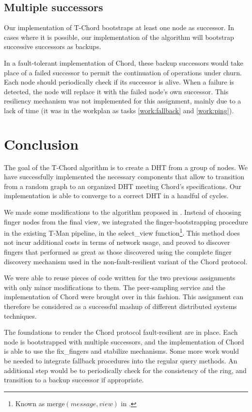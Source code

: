 \documentclass[11pt,a4paper,parskip=half]{scrartcl}
\begin{document}
\subsection{Multiple successors}

Our implementation of T-Chord bootstraps at least one node as successor.
In cases where it is possible, our implementation of the algorithm will bootstrap successive successors as backups.

In a fault-tolerant implementation of Chord, these backup successors would take place of a failed successor to permit the continuation of operations under churn.
Each node should periodically check if its successor is alive.
When a failure is detected, the node will replace it with the failed node's own successor.
This resiliency mechanism was not implemented for this assignment, mainly due to a lack of time (it was in the workplan as tasks \ref{work:fallback} and \ref{work:ping}).

\section{Conclusion}

The goal of the T-Chord algorithm is to create a DHT from a group of nodes.
We have successfully implemented the necessary components that allow to transition from a random graph to an organized DHT meeting Chord's specifications.
Our implementation is able to converge to a correct DHT in a handful of cycles.

We made some modifications to the algorithm proposed in \autocite{cod}.
Instead of choosing finger nodes from the final view, we integrated the finger-bootstrapping procedure in the existing T-Man pipeline, in the \textsf{select\_view} function\footnote{Known as $\text{merge}\left(message, view\right)$ in \autocite{cod}.}.
This method does not incur additional costs in terms of network usage, and proved to discover fingers that performed as great as those discovered using the complete finger discovery mechanism used in the non-fault-resilient variant of the Chord protocol.

We were able to reuse pieces of code written for the two previous assignments with only minor modifications to them.
The peer-sampling service and the implementation of Chord were brought over in this fashion.
This assignment can therefore be considered as a successful mashup of different distributed systems techniques.

The foundations to render the Chord protocol fault-resilient are in place.
Each node is bootstrapped with multiple successors, and the implementation of Chord is able to use the \textsf{fix\_fingers} and \textsf{stabilize} mechanisms.
Some more work would be needed to integrate fallback procedures into the regular query methods.
An additional step would be to periodically check for the consistency of the ring, and transition to a backup successor if appropriate.

\begin{otherlanguage}{australian}
\printbibliography
\end{otherlanguage}
\end{document}
